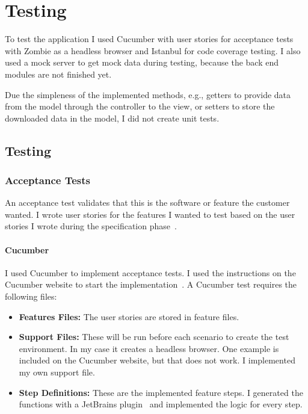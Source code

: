 \chapter{Testing}
\label{7-test}

To test the application I used Cucumber with user stories for acceptance tests with Zombie as a headless browser and Istanbul for code coverage testing. I also used a mock server to get mock data during testing, because the back end modules are not finished yet.

Due the simpleness of the implemented methods, e.g., getters to provide data from the model through the controller to the view, or setters to store the downloaded data in the model, I did not create unit tests.

\section{Testing}
\subsection{Acceptance Tests}
An acceptance test validates that this is the software or feature the customer wanted. I wrote user stories  for the features I wanted to test based on the user stories I wrote during the specification phase~\cite{szofttech}.

\subsubsection{Cucumber}
\label{cucumber-test}

I used Cucumber  to implement acceptance tests. I used the instructions on the Cucumber website to start the implementation~\cite{github-cucumberjs}. A Cucumber test requires the following files:

\begin{itemize}
	\item \textbf{Features Files:} The user stories are stored in feature files.
	\item \textbf{Support Files:} These will be run before each scenario to create the test environment. In my case it creates a headless browser. One example is included on the Cucumber website, but that does not work. I implemented my own support file.
	\item \textbf{Step Definitions:} These are the implemented feature steps. I generated the functions with a JetBrains plugin~\cite{jetbrains-cucumber} and implemented the logic for every step. 
\end{itemize}


